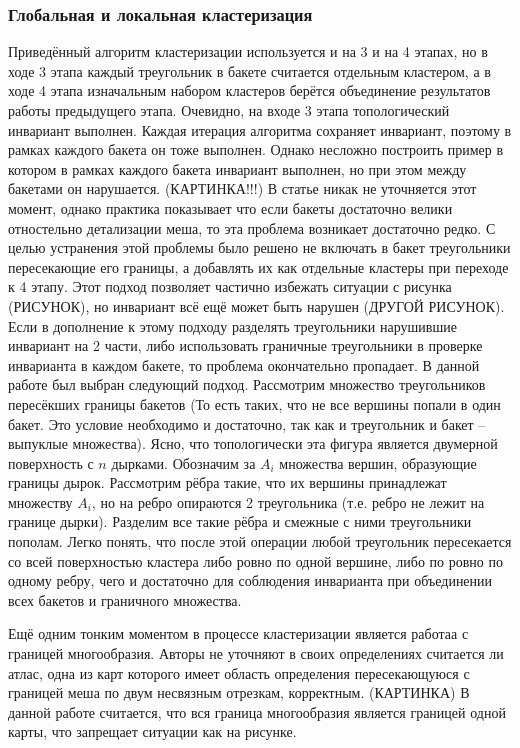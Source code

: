 \documentclass{article}
\begin{document}
\subsubsection{Глобальная и локальная кластеризация}
Приведённый алгоритм кластеризации используется и на 3 и на 4 этапах, но в ходе 3 этапа каждый треугольник в бакете считается отдельным кластером, а в ходе 4 этапа изначальным набором кластеров берётся объединение результатов работы предыдущего этапа. Очевидно, на входе 3 этапа топологический инвариант выполнен. Каждая итерация алгоритма сохраняет инвариант, поэтому в рамках каждого бакета он тоже выполнен. Однако несложно построить пример в котором в рамках каждого бакета инвариант выполнен, но при этом между бакетами он нарушается. (КАРТИНКА!!!) В статье \cite{niski2007multi} никак не уточняется этот момент, однако практика показывает что если бакеты достаточно велики отностельно детализации меша, то эта проблема возникает достаточно редко. С целью устранения этой проблемы было решено не включать в бакет треугольники пересекающие его границы, а добавлять их как отдельные кластеры при переходе к 4 этапу. Этот подход позволяет частично избежать ситуации с рисунка (РИСУНОК), но инвариант всё ещё может быть нарушен (ДРУГОЙ РИСУНОК). Если в дополнение к этому подходу разделять треугольники нарушившие инвариант на 2 части, либо использовать граничные треугольники в проверке инварианта в каждом бакете, то проблема окончательно пропадает. В данной работе был выбран следующий подход. Рассмотрим множество треугольников пересёкших границы бакетов (То есть таких, что не все вершины попали в один бакет. Это условие необходимо и достаточно, так как и треугольник и бакет -- выпуклые множества). Ясно, что топологически эта фигура является двумерной поверхность с $n$ дырками. Обозначим за $A_i$ множества вершин, образующие границы дырок. Рассмотрим рёбра такие, что их вершины принадлежат множеству $A_i$, но на ребро опираются 2 треугольника (т.е. ребро не лежит на границе дырки). Разделим все такие рёбра и смежные с ними треугольники пополам. Легко понять, что после этой операции любой треугольник пересекается со всей поверхностью кластера либо ровно по одной вершине, либо по ровно по одному ребру, чего и достаточно для соблюдения инварианта при объединении всех бакетов и граничного множества.

Ещё одним тонким моментом в процессе кластеризации является работаа с границей многообразия. Авторы \cite{purnomo2004} не уточняют в своих определениях считается ли атлас, одна из карт которого имеет область определения пересекающуюся с границей меша по двум несвязным отрезкам, корректным. (КАРТИНКА) В данной работе считается, что вся граница многообразия является границей одной карты, что запрещает ситуации как на рисунке.
\end{document}
